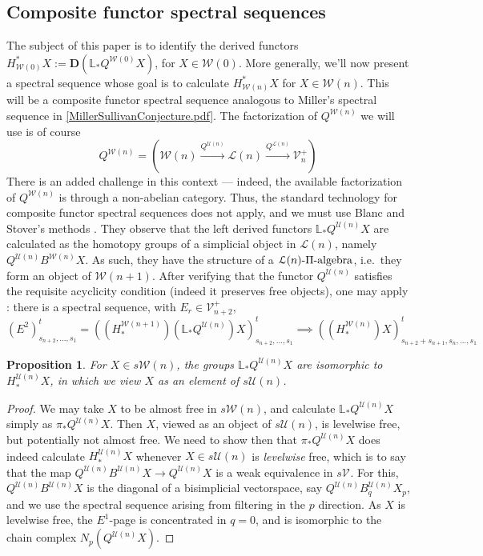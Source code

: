 \documentclass[11pt]{amsart}
\theoremstyle{plain}
\newtheorem{prop}[thm]{Proposition}
\theoremstyle{definition}
\renewcommand{\to}{\longrightarrow}
\newcommand{\calW}{\mathcal{W}}
\newcommand{\calU}{\mathcal{U}}
\newcommand{\calL}{\mathcal{L}}
\newcommand{\calV}{\mathcal{V}}
\theoremstyle{plain}
\newcommand{\vect}[2]{\calV^{#1}_{#2}}
\newcommand{\dual}{\mathbf{D}}
\begin{document}
\begin{Composite functor spectral sequences}
\vfil\pagebreak
\section{\textbf{Composite functor spectral sequences}}
The subject of this paper is to identify the derived functors $H^*_{\calW(0)}X:=\dual(\mathbb{L}_*Q^{\calW(0)}X)$, for $X\in\calW(0)$. More generally, we'll now present a spectral sequence whose goal is to calculate $H^*_{\calW(n)}X$ for $X\in\calW(n)$. This will be a composite functor spectral sequence analogous to Miller's spectral sequence in \ref{MillerSullivanConjecture.pdf}. The factorization of $Q^{\calW(n)}$ we will use is of course 
\[Q^{\calW(n)}=\left(\calW(n)\overset{Q^{\calU(n)}}{\to}\calL(n)\overset{Q^{\calL(n)}}{\to}\vect{+}{n}\right)\]
There is an added challenge in this context --- indeed, the available factorization of $Q^{\calW(n)}$ is through a non-abelian category. Thus, the standard technology for composite functor spectral sequences does not apply, and we must use Blanc and Stover's methods \cite{Blanc_Stover-Groth_SS.pdf}. They observe that the left derived functors $\mathbb{L}_*Q^{\calU(n)}X$ are calculated as the homotopy groups of a simplicial object in $\calL(n)$, namely $Q^{\calU(n)}B^{\calW(n)}X$. As such, they have the structure of a $\calL(n)\textup{-$\Pi$-algebra}$, i.e.\ they form an object of $\calW(n+1)$.  After verifying that the functor $Q^{\calU(n)}$ satisfies the requisite acyclicity condition (indeed it preserves free objects), one may apply \cite[Theorem 4.4]{Blanc_Stover-Groth_SS.pdf}: there is a spectral sequence, with $E_r\in\vect{+}{n+2}$,
\[(E^2)_{s_{n+2},\ldots,s_1}^t=((H_*^{\calW(n+1)})(\mathbb{L}_*Q^{\calU(n)})X)_{s_{n+2},\ldots,s_1}^t\implies ((H_*^{\calW(n)})X)_{s_{n+2}+s_{n+1},s_n,\ldots,s_1}^t\]
\begin{prop}
For $X\in s\calW(n)$, the groups $\mathbb{L}_*Q^{\calU(n)}X$ are isomorphic to $H_*^{\calU(n)}X$, in which we view $X$ as an element of $s\calU(n)$.
\end{prop}
\begin{proof}
We may take $X$ to be almost free in $s\calW(n)$, and calculate $\mathbb{L}_*Q^{\calU(n)}X$ simply as $\pi_*Q^{\calU(n)}X$. Then $X$, viewed as an object of $s\calU(n)$, is levelwise free, but potentially not almost free. We need to show then that $\pi_*Q^{\calU(n)}X$ does indeed calculate $H_*^{\calU(n)}X$ whenever $X\in s\calU(n)$ is \emph{levelwise} free, which is to say that the map $Q^{\calU(n)}B^{\calU(n)}X\to Q^{\calU(n)}X$ is a weak equivalence in $s\vect{}{}$. For this, $Q^{\calU(n)}B^{\calU(n)}X$ is the diagonal of a bisimplicial vectorspace, say $Q^{\calU(n)}B_q^{\calU(n)}X_p$, and we use the spectral sequence arising from filtering in the $p$ direction. As $X$ is levelwise free, the $E^1$-page is concentrated in $q=0$, and is isomorphic to the chain complex $N_p(Q^{\calU(n)}X)$.

\end{proof}
\end{Composite functor spectral sequences}
\end{document}
